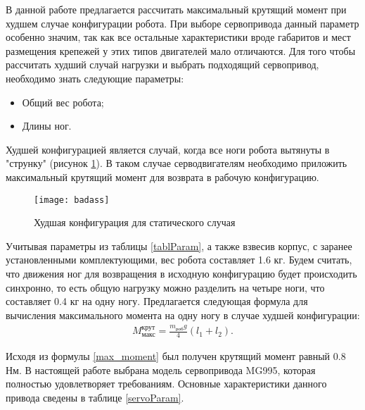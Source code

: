 В данной работе предлагается рассчитать максимальный крутящий момент при худшем случае конфигурации робота. При выборе сервопривода данный параметр особенно значим, так как все остальные характеристики вроде габаритов и мест размещения крепежей у этих типов двигателей мало отличаются. Для того чтобы рассчитать худший случай нагрузки и выбрать подходящий сервопривод, необходимо знать следующие параметры:
\begin{itemize}
	\item Общий вес робота;
	\item Длины ног.
\end{itemize}

Худшей конфигурацией является случай, когда все ноги робота вытянуты в "струнку" (рисунок \ref{badass}). В таком случае серводвигателям необходимо приложить максимальный крутящий момент для возврата в рабочую конфигурацию.

\begin{figure}[h!]
	\begin{center}
		\texttt{[image: badass]}
		\caption{{Худшая конфигурация для статического случая}}
		\label{badass}
	\end{center}
\end{figure}

Учитывая параметры из таблицы \ref{tablParam}, а также взвесив корпус, с заранее установленными комплектующими, вес робота составляет 1.6 кг. Будем считать, что движения ног для возвращения в исходную конфигурацию будет происходить синхронно, то есть общую нагрузку можно разделить на четыре ноги, что составляет 0.4 кг на одну ногу. Предлагается следующая формула для вычисления максимального момента на одну ногу в случае худшей конфигурации:
 \begin{equation}
	\begin{array}{l}
		M^{\text{крут}}_{\text{макс}} = \displaystyle\frac{m_{\text{роб}}g}{4}(l_{1}+l_{2}).
	\end{array}
	\label{max_moment}
\end{equation}

Исходя из формулы \ref{max_moment} был получен крутящий момент равный 0.8 Нм. В настоящей работе выбрана модель сервопривода MG995, которая полностью удовлетворяет требованиям. Основные характеристики данного привода сведены в таблице \ref{servoParam}.


